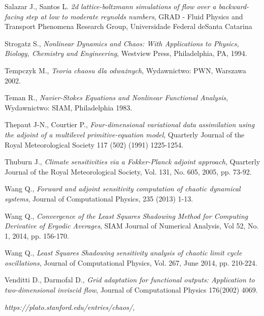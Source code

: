 \documentclass[12pt]{article}
\begin{document}
\begin{thebibliography}{99}
 Salazar J., Santos L.
\emph{2d lattice-boltzmann simulations of flow over a backward-facing step at low to moderate reynolds numbers},
GRAD - Fluid Physics and Transport Phenomena Research Group, Universidade Federal deSanta Catarina
	
 Strogatz S., 
\emph{Nonlinear Dynamics and Chaos: With Applications to Physics, Biology, Chemistry and Engineering},
Westview Press, Philadelphia, PA, 1994.  

 Tempczyk M., 
\emph{Teoria chaosu dla odważnych},
Wydawnictwo: PWN, Warszawa 2002.

 Teman R., 
\emph{Navier-Stokes Equations and Nonlinear Functional Analysis},
Wydawnictwo: SIAM, Philadelphia 1983.
	
 Thepaut J-N., Courtier P., 
\emph{Four-dimensional variational data assimilation using the adjoint of a multilevel primitive-equation model},
Quarterly Journal of the Royal Meteorological Society 117 (502) (1991) 1225-1254.

 Thuburn J.,
\emph{Climate sensitivities via a Fokker-Planck adjoint approach},
Quarterly Journal of the Royal Meteorological Society, Vol. 131, No. 605, 2005, pp. 73-92.

 Wang Q.,
\emph{Forward and adjoint sensitivity computation of chaotic dynamical systems},
Journal of Computational Physics, 235 (2013) 1-13.

 Wang Q.,
\emph{Convergence of the Least Squares Shadowing Method for Computing Derivative of Ergodic Averages},
SIAM Journal of Numerical Analysis, Vol 52, No. 1, 2014, pp. 156-170.  

 Wang Q., 
\emph{Least Squares Shadowing sensitivity analysis of chaotic limit cycle oscillations},
Journal of Computational Physics, Vol. 267, June 2014, pp. 210-224.  

 Venditti D., Darmofal D.,
\emph{Grid adaptation for functional outputs: Application to two-dimensional inviscid flow},
Journal of Computational Physics 176(2002) 4069.

\emph{https://plato.stanford.edu/entries/chaos/},
\end{thebibliography} 
\end{document}
